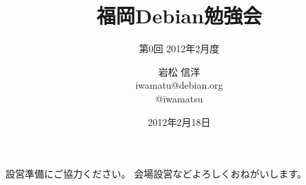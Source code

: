 \title{福岡Debian勉強会}
\subtitle{第0回 2012年2月度}
\author{岩松 信洋\\iwamatu@debian.org\\@iwamatsu}
\date{2012年2月18日}



\frame{\titlepage{}}

\begin{frame}{設営準備にご協力ください。}
会場設営などよろしくおねがいします。
\end{frame}

